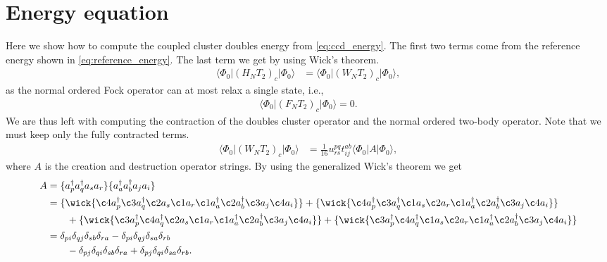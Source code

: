 \documentclass[
    a4paper, aps, twocolumn, floatfix, superscriptaddress,
    nofootinbib]{revtex4-1}
\newcommand{\1}{\mathds{1}}
\newcommand{\bra}[1]{\langle #1\lvert}
\newcommand{\ket}[1]{\rvert #1\rangle}
\newcommand{\acr}[1]{a_{#1}^{\dagger}}
\newcommand{\ade}[1]{a_{#1}}
\newcommand{\kslat}{\ket{\Phi_0}}
\newcommand{\bslat}{\bra{\Phi_0}}
\begin{document}
\section{Energy equation}
    \label{app:energy_equation}
    Here we show how to compute the coupled cluster doubles energy from
    \autoref{eq:ccd_energy}. The first two terms come from the reference energy
    shown in \autoref{eq:reference_energy}. The last term we get by using Wick's
    theorem.
    \begin{align}
        \bslat (H_N T_2)_c\kslat
        &= \bslat (W_N T_2)_c\kslat,
    \end{align}
    as the normal ordered Fock operator can at most relax a single state, i.e.,
    \begin{align}
        \bslat (F_N T_2)_c\kslat = 0.
    \end{align}
    We are thus left with computing the contraction of the doubles cluster
    operator and the normal ordered two-body operator. Note that we must keep
    only the fully contracted terms.
    \begin{align}
        \bslat (W_N T_2)_c\kslat
        &=
        \frac{1}{16} u^{pq}_{rs} t^{ab}_{ij}
        \bslat
        A
        \kslat,
        \label{eq:third_term_ccd_energy}
    \end{align}
    where $A$ is the creation and destruction operator strings. By using the
    generalized Wick's theorem we get
    \begin{align}
        A &=
        \{\acr{p}\acr{q}\ade{s}\ade{r}\}
        \{\acr{a}\acr{b}\ade{j}\ade{i}\}
        \nonumber \\
        &=
        \{
            \wick{
                    \c4 a_p^{\dagger} \c3 a_q^{\dagger}
                    \c2 a_s \c1 a_r
                    \c1 a_a^{\dagger} \c2 a_b^{\dagger}
                    \c3 a_j \c4 a_i
            }
        \}
        +
        \{
            \wick{
                    \c4 a_p^{\dagger} \c3 a_q^{\dagger}
                    \c1 a_s \c2 a_r
                    \c1 a_a^{\dagger} \c2 a_b^{\dagger}
                    \c3 a_j \c4 a_i
            }
        \}
        \nonumber \\
        &\qquad
        +
        \{
            \wick{
                    \c3 a_p^{\dagger} \c4 a_q^{\dagger}
                    \c2 a_s \c1 a_r
                    \c1 a_a^{\dagger} \c2 a_b^{\dagger}
                    \c3 a_j \c4 a_i
            }
        \}
        +
        \{
            \wick{
                    \c3 a_p^{\dagger} \c4 a_q^{\dagger}
                    \c1 a_s \c2 a_r
                    \c1 a_a^{\dagger} \c2 a_b^{\dagger}
                    \c3 a_j \c4 a_i
            }
        \}
        \nonumber \\
        &=
        \delta_{pi}\delta_{qj}\delta_{sb}\delta_{ra}
        - \delta_{pi}\delta_{qj}\delta_{sa}\delta_{rb}
        \nonumber \\
        &\qquad
        - \delta_{pj}\delta_{qi}\delta_{sb}\delta_{ra}
        + \delta_{pj}\delta_{qi}\delta_{sa}\delta_{rb}.
    \end{align}
\end{document}
